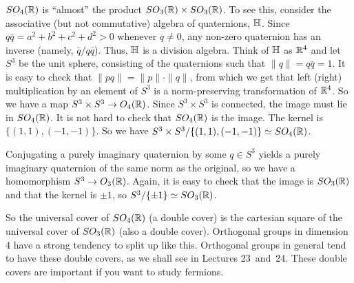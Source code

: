 \begin{example}
  $SO_4(\mathbb{R})$ is ``almost'' the product $SO_3(\mathbb{R})\times SO_3(\mathbb{R})$. To see this,
  consider the associative (but not commutative) algebra of quaternions, $\mathbb{H}$. Since
  $q\bar q = a^2+b^2+c^2+d^2 >0$ whenever $q\neq 0$, any non-zero quaternion has an
  inverse (namely, $\bar q/q\bar q$). Thus, $\mathbb{H}$ is a division algebra. Think of
  $\mathbb{H}$ as $\mathbb{R}^4$ and let $S^3$ be the unit sphere, consisting of the quaternions
  such that $\|q\|=q\bar q=1$. It is easy to check that $\|pq\|=\|p\|\cdot \|q\|$,
  from which we get that left (right) multiplication by an element of $S^3$ is a
  norm-preserving transformation of $\mathbb{R}^4$. So we have a map $S^3\times S^3\to
  O_4(\mathbb{R})$. Since $S^3\times S^3$ is connected, the image must lie in $SO_4(\mathbb{R})$. It
  is not hard to check that $SO_4(\mathbb{R})$ is the image. The kernel is
  $\{(1,1),(-1,-1)\}$. So we have $S^3\times S^3/\{(1,1),(-1,-1)\}\simeq SO_4(\mathbb{R})$.

  Conjugating a purely imaginary quaternion by some $q\in S^3$ yields a purely
  imaginary quaternion of the same norm as the original, so we have a homomorphism
  $S^3\to O_3(\mathbb{R})$. Again, it is easy to check that the image is $SO_3(\mathbb{R})$ and that
  the kernel is $\pm 1$, so $S^3/\{\pm 1\}\simeq SO_3(\mathbb{R})$.

  So the universal cover of $SO_4(\mathbb{R})$ (a double cover) is the cartesian square of
  the universal cover of $SO_3(\mathbb{R})$ (also a double cover). Orthogonal groups in
  dimension 4 have a strong tendency to split up like this. Orthogonal groups in general tend to have these double covers, as
  we shall see in Lectures 23~and~24. These double covers are important if you want
  to study fermions.
 \end{example}

